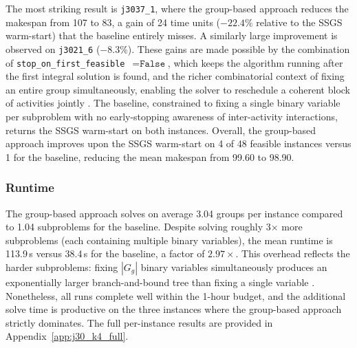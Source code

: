 The most striking result is \texttt{j3037\_1}, where the
group-based approach reduces the makespan from 107 to 83, a
gain of 24 time units ($-22.4\%$ relative to the SSGS
warm-start) that the baseline entirely misses. A similarly
large improvement is observed on \texttt{j3021\_6} ($-8.3\%$).
These gains are made possible by the combination of
\texttt{stop\_on\_first\_feasible}~$=\texttt{False}$, which
keeps the algorithm running after the first integral solution
is found, and the richer combinatorial context of fixing
an entire group simultaneously, enabling the solver to
reschedule a coherent block of activities jointly
\parencite{pochet2006}. The baseline, constrained to fixing a
single binary variable per subproblem with no early-stopping
awareness of inter-activity interactions, returns the SSGS
warm-start on both instances. Overall, the group-based approach
improves upon the SSGS warm-start on 4 of 48 feasible instances
versus 1 for the baseline, reducing the mean makespan from
99.60 to 98.90.

\subsubsection*{Runtime}

The group-based approach solves on average 3.04 groups per
instance compared to 1.04 subproblems for the baseline. Despite
solving roughly 3$\times$ more subproblems (each containing
multiple binary variables), the mean runtime is 113.9\,s versus
38.4\,s for the baseline, a factor of $2.97\times$. This
overhead reflects the harder subproblems: fixing $|G_g|$ binary
variables simultaneously produces an exponentially larger
branch-and-bound tree than fixing a single variable
\parencite{Wolsey1998}. Nonetheless, all runs complete well
within the 1-hour budget, and the additional solve time is
productive on the three instances where the group-based approach
strictly dominates. The full per-instance results are provided
in Appendix~\ref{app:j30_k4_full}.
